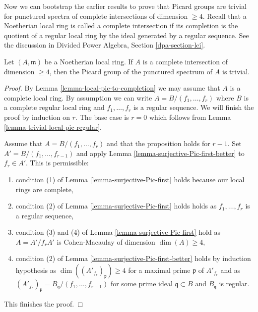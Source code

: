 \noindent
Now we can bootstrap the earlier results to prove that
Picard groups are trivial for punctured spectra
of complete intersections of dimension $\geq 4$.
Recall that a Noetherian local ring is called a complete
intersection if its completion is the quotient of a
regular local ring by the ideal generated by a regular sequence.
See the discussion in Divided Power Algebra, Section \ref{dpa-section-lci}.

\begin{proposition}[Grothendieck]
\label{proposition-trivial-local-pic-complete-intersection}
Let $(A, \mathfrak m)$ be a Noetherian local ring. If $A$ is a
complete intersection of dimension $\geq 4$, then the Picard
group of the punctured spectrum of $A$ is trivial.
\end{proposition}

\begin{proof}
By Lemma \ref{lemma-local-pic-to-completion} we may assume that $A$ is
a complete local ring. By assumption we can write
$A = B/(f_1, \ldots, f_r)$ where $B$ is a complete regular local
ring and $f_1, \ldots, f_r$ is a regular sequence.
We will finish the proof by induction on $r$.
The base case is $r = 0$ which follows from
Lemma \ref{lemma-trivial-local-pic-regular}.

\medskip\noindent
Assume that $A = B/(f_1, \ldots, f_r)$ and that the proposition
holds for $r - 1$. Set $A' = B/(f_1, \ldots, f_{r - 1})$ and apply
Lemma \ref{lemma-surjective-Pic-first-better} to $f_r \in A'$.
This is permissible:
\begin{enumerate}
\item condition (1) of Lemma \ref{lemma-surjective-Pic-first} holds
because our local rings are complete,
\item condition (2) of Lemma \ref{lemma-surjective-Pic-first} holds
holds as $f_1, \ldots, f_r$ is a regular sequence,
\item condition (3) and (4) of Lemma \ref{lemma-surjective-Pic-first} hold
as $A = A'/f_r A'$ is Cohen-Macaulay of dimension $\dim(A) \geq 4$,
\item condition (2) of Lemma \ref{lemma-surjective-Pic-first-better}
holds by induction hypothesis as
$\dim((A'_{f_r})_\mathfrak p) \geq 4$ for a maximal
prime $\mathfrak p$ of $A'_{f_r}$ and as
$(A'_{f_r})_\mathfrak p = B_\mathfrak q/(f_1, \ldots, f_{r - 1})$
for some prime ideal $\mathfrak q \subset B$ and $B_\mathfrak q$ is regular.
\end{enumerate}
This finishes the proof.
\end{proof}

